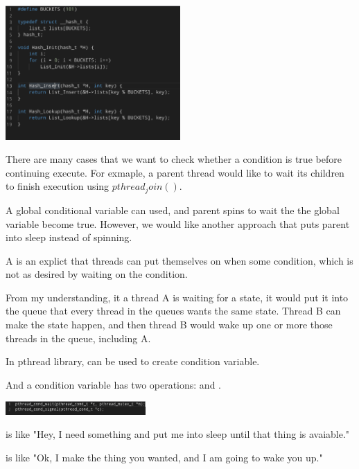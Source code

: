     \includegraphics[width=0.5\textwidth]{chapters/Cucurrency/Cucurrency/concurrent_hashtable.png}



    There are many cases that we want to check whether a condition is true before continuing execute. 
    For exmaple, a parent thread would like to wait its children to finish execution using $pthread_join()$.

    A global conditional variable can used, and parent spins to wait the the global variable become true.
    However, we would like another approach that puts parent into sleep instead of spinning.


    A  is an explict  that threads can put themselves on 
    when some condition, which is not as desired by waiting on the condition.

    From my understanding, it a thread A is waiting for a state, it would put it into the queue that 
    every thread in the queues wants the same state. Thread B can make the state happen, and then thread 
    B would wake up one or more those threads in the queue, including A.


    In pthread library,  can be used to create condition variable. 
    
    And a condition variable has two operations:  and .

    \includegraphics[width=0.4\textwidth]{chapters/Cucurrency/Cucurrency/wait_signal.png}

     is like "Hey, I need something and put me into sleep until that thing is avaiable."

     is like "Ok, I make the thing you wanted, and I am going to wake you up."

